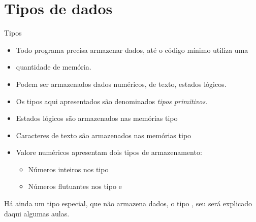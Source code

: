 \documentclass[11pt]{beamer}
\subtitle{Tipo assim\dots}
\begin{document}
\begin{frame}
	\titlepage
\end{frame}

\begin{frame}
	\tableofcontents
\end{frame}

\section{Tipos de dados}
	\begin{frame}{Tipos}
		\only<1>	
		{
			\begin{itemize}
				\presentationPause\item Todo programa precisa armazenar dados, até o código mínimo utiliza uma \presentationPause\item quantidade de memória.
				\presentationPause\item Podem ser armazenados dados numéricos, de texto, estados lógicos.
				\presentationPause\item Os tipos aqui apresentados são denominados \emph{tipos primitivos}.
			\end{itemize}
		}
		{
			\begin{itemize}
				\presentationPause\item Estados lógicos são armazenados nas memórias tipo 
				\presentationPause\item Caracteres de texto são armazenados nas memórias tipo 
				\presentationPause\item Valore numéricos apresentam dois tipos de armazenamento:
				\begin{itemize}
					\presentationPause\item Números inteiros nos tipo 
					\presentationPause\item Números flutuantes nos tipo  e 
				\end{itemize}
			\end{itemize}
			\presentationPause Há ainda um tipo especial, que não armazena dados, o tipo , seu será explicado daqui algumas aulas.
		}
	\end{frame}
\end{document}
